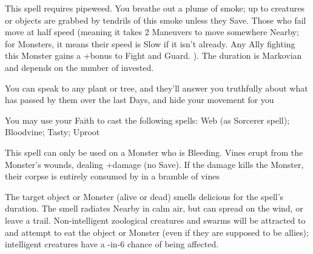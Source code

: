 {This spell requires pipeweed.  You breathe out a plume of smoke; up to \DICE creatures or objects are grabbed by tendrils of this smoke unless they Save.  Those who fail move at half speed (meaning it takes 2 Maneuvers to move somewhere Nearby; for Monsters, it means their speed is Slow if it isn't already.  Any Ally fighting this Monster gains a +\DICE bonus to Fight and Guard. ). The duration is Markovian and depends on the number of \DICE invested.



\GOD[
Name=The Green Man,
Link=small-god-the green man,
GodOf=Lord of the Wood,
Holy=a crown of ivy or holly
]


You can speak to any plant or tree, and they'll answer you truthfully about what has passed by them over the last Days, and hide your movement for you


You may use your Faith to cast the following spells: Web (as Sorcerer spell); Bloodvine; Tasty; Uproot


\LITURGY [
  Name= Bloodvine,
  Link= green-man-liturgy-bloodvine,
  Paradigm= Biomancy ,
  Save=  N ,
  Duration= 0 ,
  Counter=  n/a  ,
  Keywords= None ,
  Target=   Close or Nearby Monster
]



This spell can only be used on a Monster who is Bleeding.  Vines erupt from the Monster's wounds, dealing \SUMDICE+\DICE damage (no Save).  If the damage kills the Monster, their corpse is entirely consumed by in a bramble of vines

\LITURGY [
  Name= Tasty,
  Link=green-man-liturgy-tasty,
  Paradigm= Biomancy ,
  Save=  N ,
  Duration= Combat or \SUMDICE Minutes ,
  Counter=  n/a  ,
  Keywords= None ,
  Target=   Close (touch) Monster or object
]



The target object or Monster (alive or dead) smells delicious for the spell's duration.  The smell radiates Nearby in calm air, but can spread on the wind, or leave a trail.  Non-intelligent zoological creatures and swarms will be attracted to and attempt to eat the object or Monster (even if they are supposed to be allies); intelligent creatures have a \DICE-in-6 chance of being affected.  

\LITURGY [
  Name= Uproot,
  Link=green-man-liturgy-uproot,
  Paradigm= Biomancy ,
  Save=  N ,
  Duration= 0 ,
  Counter=  n/a  ,
  Keywords= Splittable ,
  Target=   Close (touch) tree
]



}
